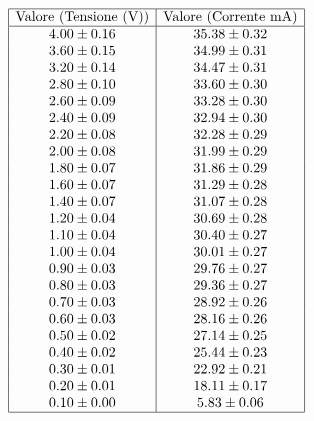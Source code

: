 \documentclass[a4paper,11pt]{article}
\begin{document}
    \begin{minipage}{0.4\textwidth}
        \[
\begin{array}{|c|c|}
\hline
\text{Valore (Tensione (V))} & \text{Valore (Corrente mA)} \\ \hline
4.00 \pm 0.16 & 35.38 \pm 0.32 \\ 
3.60 \pm 0.15 & 34.99 \pm 0.31 \\ 
3.20 \pm 0.14 & 34.47 \pm 0.31 \\ 
2.80 \pm 0.10 & 33.60 \pm 0.30 \\ 
2.60 \pm 0.09 & 33.28 \pm 0.30 \\ 
2.40 \pm 0.09 & 32.94 \pm 0.30 \\ 
2.20 \pm 0.08 & 32.28 \pm 0.29 \\ 
2.00 \pm 0.08 & 31.99 \pm 0.29 \\ 
1.80 \pm 0.07 & 31.86 \pm 0.29 \\ 
1.60 \pm 0.07 & 31.29 \pm 0.28 \\ 
1.40 \pm 0.07 & 31.07 \pm 0.28 \\ 
1.20 \pm 0.04 & 30.69 \pm 0.28 \\ 
1.10 \pm 0.04 & 30.40 \pm 0.27 \\ 
1.00 \pm 0.04 & 30.01 \pm 0.27 \\ 
0.90 \pm 0.03 & 29.76 \pm 0.27 \\ 
0.80 \pm 0.03 & 29.36 \pm 0.27 \\ 
0.70 \pm 0.03 & 28.92 \pm 0.26 \\ 
0.60 \pm 0.03 & 28.16 \pm 0.26 \\ 
0.50 \pm 0.02 & 27.14 \pm 0.25 \\ 
0.40 \pm 0.02 & 25.44 \pm 0.23 \\ 
0.30 \pm 0.01 & 22.92 \pm 0.21 \\ 
0.20 \pm 0.01 & 18.11 \pm 0.17 \\ 
0.10 \pm 0.00 & 5.83 \pm 0.06 \\ \hline
\end{array}
\]
    \end{minipage}
\end{document}
